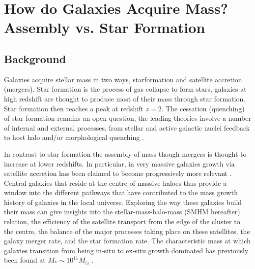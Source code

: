 

\chapter{How do Galaxies Acquire Mass? Assembly vs. Star Formation} %
\label{Chapter:GalGrowth}

\section{Background}
Galaxies acquire stellar mass in two ways, starformation and satellite accretion (mergers). Star formation is the process of gas collapse to form stars, galaxies at high redshift are thought to produce most of their mass through star formation. Star formation then reaches a peak at redshift $z=2$. The cessation (quenching) of star formation remains an open question, the leading theories involve a number of internal and external processes, from stellar and active galactic nuclei feedback to host halo and/or morphological quenching \citep{Granato2004AHosts, Dekel2009ColdFormation, Lilly2013GASHALOS, Schawinski2014TheGalaxies}. 

In contrast to star formation the assembly of mass though mergers is thought to increase at lower redshifts. In particular, in very massive galaxies growth via satellite accretion has been claimed to become progressively more relevant \citep{DeLucia2006TheGalaxies,vanDokkum2010THE2, Shankar2013SizeUniverse, Shankar2015, Buchan2016, Groenewald2017TheGrowth, Matharu2019HSTMergers}. Central galaxies that reside at the centre of massive haloes thus provide a window into the different pathways that have contributed to the mass growth history of galaxies in the local universe. Exploring the way these galaxies build their mass can give insights into the stellar-mass-halo-mass (SMHM hereafter) relation, the efficiency of the satellite transport from the edge of the cluster to the centre, the balance of the major processes taking place on these satellites, the galaxy merger rate, and the star formation rate. The characteristic mass at which galaxies transition from being in-situ to ex-situ growth dominated has previously been found at $M_* \sim 10^{11} M_{\odot}$ \citep{Cattaneo2011HowMass, Bernardi2011EvidenceRelations, Shankar2013SizeUniverse}. 

